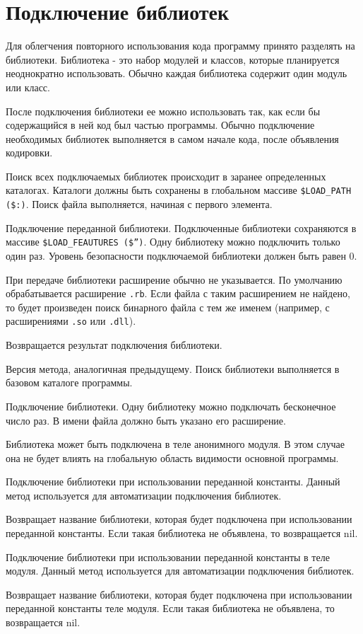 \chapter{Подключение библиотек}

Для облегчения повторного использования кода программу принято разделять на библиотеки. Библиотека - это набор модулей и классов, которые планируется неоднократно использовать. Обычно каждая библиотека содержит один модуль или класс.

После подключения библиотеки ее можно использовать так, как если бы содержащийся в ней код был частью программы. Обычно подключение необходимых библиотек выполняется в самом начале кода, после объявления кодировки.

Поиск всех подключаемых библиотек происходит в заранее определенных каталогах. Каталоги должны быть сохранены в глобальном массиве \verb!$LOAD_PATH ($:)!. Поиск файла выполняется, начиная с первого элемента.

\begin{methodlist}
  Подключение переданной библиотеки. Подключенные библиотеки сохраняются в массиве \verb!$LOAD_FEAUTURES ($”)!. Одну библиотеку можно подключить только один раз. Уровень безопасности подключаемой библиотеки должен быть равен 0.

  При передаче библиотеки расширение обычно не указывается. По умолчанию обрабатывается расширение \verb!.rb!. Если файла с таким расширением не найдено, то будет произведен поиск бинарного файла с тем же именем (например, с расширениями \verb!.so! или \verb!.dll!).
   
  Возвращается результат подключения библиотеки. 

  Версия метода, аналогичная предыдущему. Поиск библиотеки выполняется в базовом каталоге программы.
 
  Подключение библиотеки. Одну библиотеку можно подключать бесконечное число раз. В имени файла должно быть указано его расширение.

  Библиотека может быть подключена в теле анонимного модуля. В этом случае она не будет влиять на глобальную область видимости основной программы. 
 
  Подключение библиотеки при использовании переданной константы. Данный метод используется для автоматизации подключения библиотек.
 
  Возвращает название библиотеки, которая будет подключена при использовании переданной константы. Если такая библиотека не объявлена, то возвращается nil. 
 
  Подключение библиотеки при использовании переданной константы в теле модуля. Данный метод используется для автоматизации подключения библиотек.
 
  Возвращает название библиотеки, которая будет подключена при использовании переданной константы  теле модуля. Если такая библиотека не объявлена, то возвращается nil. 
\end{methodlist}
